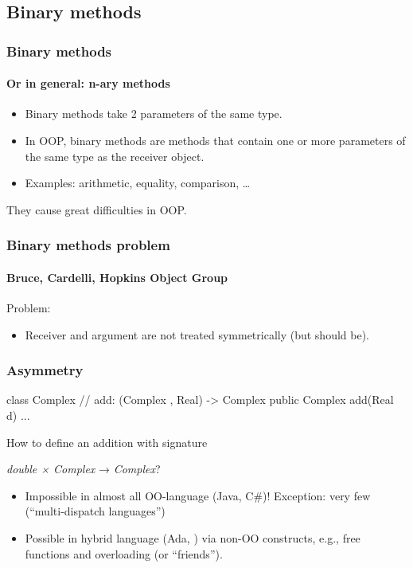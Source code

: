 \documentclass{beamer}
\begin{document}
\subsection{Binary methods}

\begin{frame}[fragile]
\frametitle{Binary methods}
\framesubtitle{Or in general: n-ary methods}
\begin{itemize}
\item Binary methods take 2 parameters of the same type.
\item 
In OOP, binary methods are methods that contain one or more parameters
of the same type as the receiver object.
\item Examples: arithmetic, equality, comparison, \ldots
\end{itemize}
\bigskip

They cause great difficulties in OOP. 
\end{frame}

\begin{frame}[fragile]
\frametitle{Binary methods problem}
\framesubtitle{Bruce, Cardelli, Hopkins Object Group }

Problem: 

\begin{itemize}
\item Receiver and argument are not treated symmetrically (but
should be). 
\end{itemize}





\end{frame}

\begin{frame}[fragile]
\frametitle{Asymmetry}
\begin{cplus3}
class Complex 
{
    // add: (Complex , Real) -> Complex  
    public Complex add(Real d) {...}
}
\end{cplus3}
How to define an addition with signature 
\begin{center}
\textit{double × Complex} → \textit{Complex}?
\end{center}
\begin{itemize}
\item Impossible in almost all OO-language (Java, C\#)!
Exception: very few (``multi-dispatch languages'') 
\item Possible in hybrid language (Ada, \Cpp) via non-OO constructs,
e.g., free functions and overloading (or ``friends''). 
\end{itemize}
\end{frame}
\end{document}
